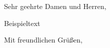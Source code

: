\documentclass{\basedir/vorlagen/brief/fablab-brief}
\begin{document}
\begin{fauletter} %
\opening{Sehr geehrte Damen und Herren,} %

Beispieltext
\closing{Mit freundlichen Grüßen,} %
\end{fauletter}
\end{document}
